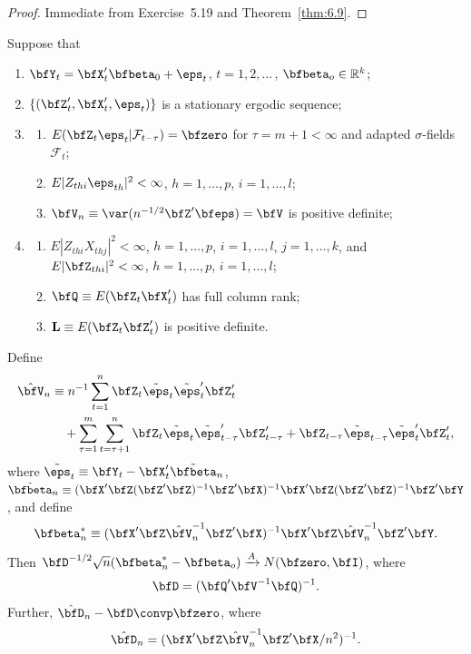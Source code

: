\begin{proof}
Immediate from Exercise~5.19 and Theorem~\ref{thm:6.9}.
\end{proof}

\begin{corollary}\label{cor:6.11}
Suppose that
\begin{enumerate}[label=(\roman*)]
  \item $\bfY_t = \bfX_t'\bfbeta_0 + \eps_t$, \quad $t = 1,2,\ldots$\,, \quad $\bfbeta_o \in \mathbb{R}^k$;
  \item $\{(\bfZ_t',\bfX_t',\eps_t)\}$ is a stationary ergodic sequence;
  \item\begin{enumerate}[label=(\alph*)]
    \item $E(\bfZ_t\eps_t|\mathcal{F}_{t-\tau}) = \bfzero$ for $\tau = m+1 < \infty$ and adapted $\sigma$-fields $\mathcal{F}_t$;
    \item $E|Z_{thi}\eps_{th}|^2 < \infty$, $h = 1,\ldots,p$, $i = 1,\ldots,l$;
    \item $\bfV_n \equiv \var(n^{-1/2}\bfZ'\bfeps) = \bfV$ is positive definite;
  \end{enumerate}
  \item\begin{enumerate}[label=(\alph*)]
    \item $E|Z_{thi}X_{thj}|^2 < \infty$, $h = 1,\ldots,p$, $i = 1,\ldots,l$, $j = 1,\ldots,k$, and $E|\bfZ_{thi}|^2 < \infty$, $h = 1,\ldots,p$, $i = 1,\ldots,l$;
    \item $\bfQ \equiv E(\bfZ_t\bfX_t')$ has full column rank;
    \item $\mathbf{L} \equiv E(\bfZ_t\bfZ_t')$ is positive definite.
  \end{enumerate}
\end{enumerate}
Define
\begin{align*}
  \hat{\bfV}_n &\equiv n^{-1}\sum_{t=1}^{n}\bfZ_t\tilde{\eps}_t\tilde{\eps}_t'\bfZ_t' \\
    &\quad + \sum_{\tau=1}^{m}\sum_{t=\tau+1}^{n}\bfZ_t\tilde{\eps}_t\tilde{\eps}_{t-\tau}'\bfZ_{t-\tau}' + \bfZ_{t-\tau}\tilde{\eps}_{t-\tau}\tilde{\eps}_t'\bfZ_t',
\end{align*}
where $\tilde{\eps}_t \equiv \bfY_t - \bfX_t'\tilde{\bfbeta}_n$, $\tilde{\bfbeta}_n \equiv (\bfX'\bfZ(\bfZ'\bfZ)^{-1}\bfZ'\bfX)^{-1}\bfX'\bfZ(\bfZ'\bfZ)^{-1}\bfZ'\bfY$, and define
\[
  \bfbeta_n^* \equiv (\bfX'\bfZ\hat{\bfV}_n^{-1}\bfZ'\bfX)^{-1}\bfX'\bfZ\hat{\bfV}_n^{-1}\bfZ'\bfY.
\]
Then $\bfD^{-1/2}\sqrt{n}(\bfbeta_n^* - \bfbeta_o) \xrightarrow{A} N(\bfzero,\bfI)$, where
\[
  \bfD = (\bfQ'\bfV^{-1}\bfQ)^{-1}.
\]
Further, $\hat{\bfD}_n - \bfD \convp \bfzero$, where
\[
  \hat{\bfD}_n = (\bfX'\bfZ\hat{\bfV}_n^{-1}\bfZ'\bfX/n^2)^{-1}.
\]
\end{corollary}

